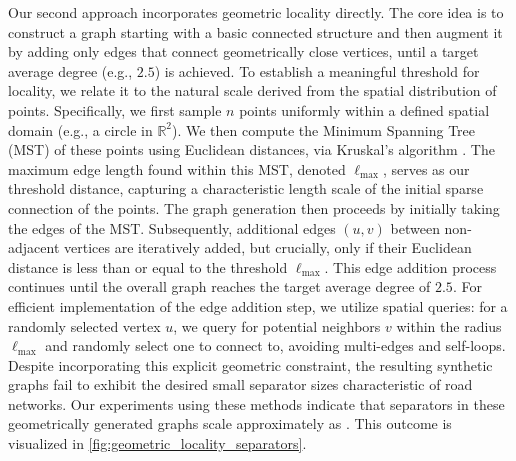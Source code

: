 Our second approach incorporates geometric locality directly.
The core idea is to construct a graph starting with a basic connected structure and then augment it by adding only edges that connect geometrically close vertices, until a target average degree (e.g., \(2.5\)) is achieved.
To establish a meaningful threshold for locality, we relate it to the natural scale derived from the spatial distribution of points.
Specifically, we first sample \(n\) points uniformly within a defined spatial domain (e.g., a circle in \(\mathbb R^2\)).
We then compute the Minimum Spanning Tree (MST) of these points using Euclidean distances, via Kruskal's algorithm \cite{kruskal_shortest_1956}.
The maximum edge length found within this MST, denoted \(\ell_{\max}\), serves as our threshold distance, capturing a characteristic length scale of the initial sparse connection of the points.
The graph generation then proceeds by initially taking the edges of the MST.
Subsequently, additional edges \((u, v)\) between non-adjacent vertices are iteratively added, but crucially, only if their Euclidean distance is less than or equal to the threshold \(\ell_{\max}\).
This edge addition process continues until the overall graph reaches the target average degree of \(2.5\).
For efficient implementation of the edge addition step, we utilize spatial queries: for a randomly selected vertex \(u\), we query for potential neighbors \(v\) within the radius \(\ell_{\max}\) and randomly select one to connect to, avoiding multi-edges and self-loops.
Despite incorporating this explicit geometric constraint, the resulting synthetic graphs fail to exhibit the desired small separator sizes characteristic of road networks.
Our experiments using these methods indicate that separators in these geometrically generated graphs scale approximately as .
This outcome is visualized in \cref{fig:geometric_locality_separators}.

